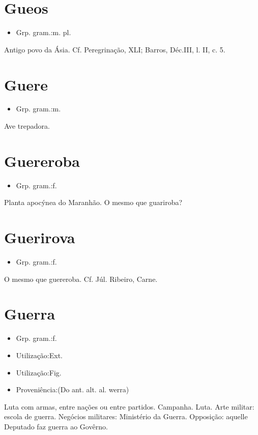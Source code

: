 \section{Gueos}
\begin{itemize}
\item {Grp. gram.:m. pl.}
\end{itemize}
Antigo povo da Ásia. Cf. \textunderscore Peregrinação\textunderscore , XLI; Barros, \textunderscore Déc.\textunderscore  III, l. II, c. 5.
\section{Guere}
\begin{itemize}
\item {Grp. gram.:m.}
\end{itemize}
Ave trepadora.
\section{Guereroba}
\begin{itemize}
\item {Grp. gram.:f.}
\end{itemize}
Planta apocýnea do Maranhão.
O mesmo que \textunderscore guariroba\textunderscore ?
\section{Guerirova}
\begin{itemize}
\item {Grp. gram.:f.}
\end{itemize}
O mesmo que \textunderscore guereroba\textunderscore . Cf. Júl. Ribeiro, \textunderscore Carne\textunderscore .
\section{Guerra}
\begin{itemize}
\item {Grp. gram.:f.}
\end{itemize}
\begin{itemize}
\item {Utilização:Ext.}
\end{itemize}
\begin{itemize}
\item {Utilização:Fig.}
\end{itemize}
\begin{itemize}
\item {Proveniência:(Do ant. alt. al. \textunderscore werra\textunderscore )}
\end{itemize}
Luta com armas, entre nações ou entre partidos.
Campanha.
Luta.
Arte militar: \textunderscore escola de guerra\textunderscore .
Negócios militares: \textunderscore Ministério da Guerra\textunderscore .
Opposição: \textunderscore aquelle Deputado faz guerra ao Govêrno\textunderscore .
